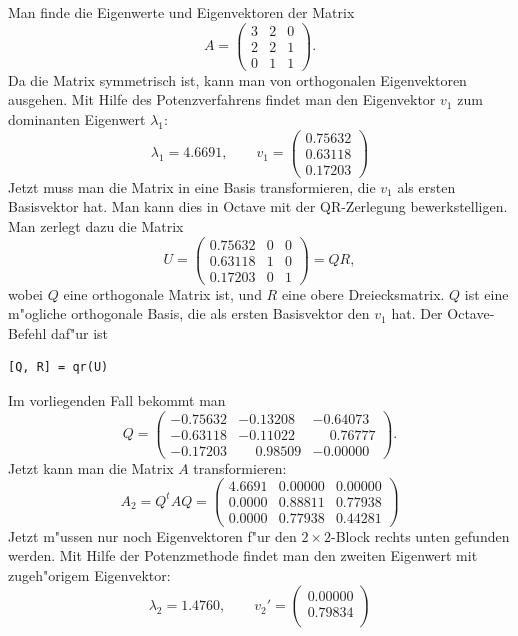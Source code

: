 \begin{beispiel}
Man finde die Eigenwerte und Eigenvektoren der Matrix 
\[
A=\begin{pmatrix}
3&2&0\\
2&2&1\\
0&1&1
\end{pmatrix}.
\]
Da die Matrix symmetrisch ist, kann man von orthogonalen Eigenvektoren
ausgehen.
Mit Hilfe des Potenzverfahrens findet man den Eigenvektor $v_1$
zum dominanten Eigenwert $\lambda_1$:
\[
\lambda_1=4.6691,\qquad
v_1
=
\begin{pmatrix}
0.75632\\
0.63118\\
0.17203
\end{pmatrix}
\]
Jetzt muss man die Matrix in eine Basis transformieren, die $v_1$ als
ersten Basisvektor hat.
Man kann dies in Octave mit der QR-Zerlegung bewerkstelligen.
Man zerlegt dazu die Matrix
\[
U=
\begin{pmatrix}
0.75632&0&0\\
0.63118&1&0\\
0.17203&0&1
\end{pmatrix}
=QR,
\]
wobei $Q$ eine orthogonale Matrix ist, und $R$ eine obere Dreiecksmatrix.
$Q$ ist eine m"ogliche orthogonale Basis, die als ersten Basisvektor
den $v_1$ hat. Der Octave-Befehl daf"ur ist
\begin{verbatim}
[Q, R] = qr(U)
\end{verbatim}
Im vorliegenden Fall bekommt man
\[
Q=
\begin{pmatrix}
-0.75632&           -0.13208&           -0.64073\\
-0.63118&           -0.11022& \phantom{-}0.76777\\
-0.17203& \phantom{-}0.98509&           -0.00000
\end{pmatrix}.
\]
Jetzt kann man die Matrix $A$ transformieren:
\[
A_2 = Q^t A Q=
\begin{pmatrix}
   4.6691 & 0.00000 & 0.00000\\
   0.0000 & 0.88811 & 0.77938\\
   0.0000 & 0.77938 & 0.44281
\end{pmatrix}
\]
Jetzt m"ussen nur noch Eigenvektoren f"ur den $2\times 2$-Block rechts
unten gefunden werden.
Mit Hilfe der Potenzmethode findet man den zweiten Eigenwert mit
zugeh"origem Eigenvektor:
\[
\lambda_2=1.4760,\qquad
v_2'=\begin{pmatrix}
   0.00000\\
   0.79834\\

\end{pmatrix}\]
\end{beispiel}
